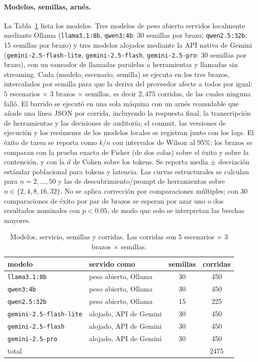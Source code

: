 \documentclass[conference,letterpaper]{IEEEtran}
\begin{document}
\paragraph{Modelos, semillas, arnés.} La Tabla~\ref{tab:models} lista los modelos. Tres modelos de peso abierto servidos localmente mediante Ollama
(\texttt{llama3.1:8b}, \texttt{qwen3:4b}: 30 semillas por brazo; \texttt{qwen2.5:32b}: 15 semillas por
brazo) y tres modelos alojados mediante la API nativa de Gemini (\texttt{gemini-2.5-flash-lite},
\texttt{gemini-2.5-flash}, \texttt{gemini-2.5-pro}: 30 semillas por brazo), con un saneador de llamadas
paralelas a herramientas y llamadas sin streaming. Cada (modelo, escenario, semilla) se ejecuta en los
tres brazos, intercalados por semilla para que la deriva del proveedor afecte a todos por igual: $5$
escenarios $\times$ $3$ brazos $\times$ semillas, es decir $2{,}475$ corridas, de las cuales ninguna
falló. El barrido se ejecutó en una sola máquina con un arnés reanudable que añade una línea JSON por
corrida, incluyendo la respuesta final, la transcripción de herramientas y las decisiones de auditoría;
el commit, las versiones de ejecución y los resúmenes de los modelos locales se registran junto con los
logs. El éxito de tarea se reporta como $k/n$ con intervalos de Wilson al 95\%; los brazos se comparan
con la prueba exacta de Fisher (de dos colas) sobre el éxito y sobre la contención, y con la $d$ de
Cohen sobre los tokens. Se reporta media $\pm$ desviación estándar poblacional para tokens y latencia.
Las curvas estructurales se calculan para $n=2,\dots,50$ y las de descubrimiento/prompt de herramientas
sobre $n\in\{2,4,8,16,32\}$. No se aplica corrección por comparaciones múltiples; con $30$ comparaciones
de éxito por par de brazos se esperan por azar uno o dos resultados nominales con $p<0.05$, de modo que
solo se interpretan las brechas mayores.

\begin{table}[H]
\centering
\caption{Modelos, servicio, semillas y corridas. Las corridas son $5$ escenarios $\times$ $3$ brazos $\times$ semillas.}
\label{tab:models}
\footnotesize
\setlength{\tabcolsep}{3pt}
\begin{tabular}{llcc}
\toprule
modelo & servido como & semillas & corridas \\
\midrule
\texttt{llama3.1:8b} & peso abierto, Ollama & 30 & 450 \\
\texttt{qwen3:4b} & peso abierto, Ollama & 30 & 450 \\
\texttt{qwen2.5:32b} & peso abierto, Ollama & 15 & 225 \\
\texttt{gemini-2.5-flash-lite} & alojado, API de Gemini & 30 & 450 \\
\texttt{gemini-2.5-flash} & alojado, API de Gemini & 30 & 450 \\
\texttt{gemini-2.5-pro} & alojado, API de Gemini & 30 & 450 \\
\midrule
total & & & 2475 \\
\bottomrule
\end{tabular}
\end{table}
\end{document}

